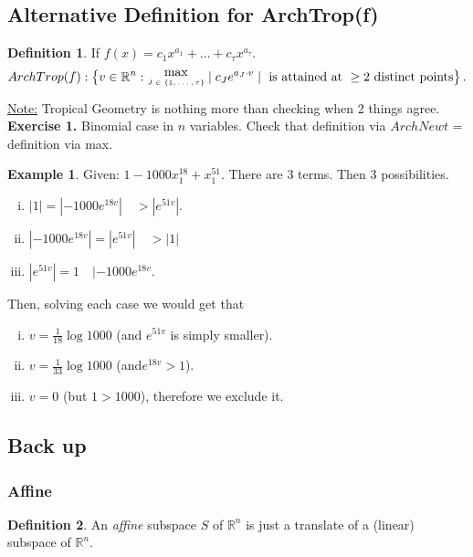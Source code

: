 \documentclass[]{article}
\theoremstyle{definition}
\newtheorem*{defn}{Definition}
\newtheorem{ex}{Example}[section]
\begin{document}
			\subsection{Alternative Definition for ArchTrop(f)}
			\begin{defn}
			If $f(x)=c_1x^{a_1} +\ldots+c_\tau x^{a_\tau}$.
			\begin{align*}
			ArchTrop(f): \left\{ v \in \mathbb{R}^n : \stackanchor{max}{\tiny{$J\in\{1,\ldots,\tau\}$}} \mid c_{J}e^{a_J\cdot v} \mid \text{ is attained at }\geq 2 \text{ distinct points}\right\}.
			\end{align*}
			\end{defn}
			\underline{Note:} Tropical Geometry is nothing more than checking when 2 things agree.
			\\
			\textbf{Exercise 1.} Binomial case in $n$ variables. Check that definition via $ArchNewt$ = definition via max.
			\begin{ex}
			Given: $1-1000x_1^{18}+x_1^{51}.$ There are 3 terms. Then 3 possibilities.
			\begin{enumerate}[(i)]
			\item $|1|=|-1000e^{18v}| \quad > |e^{51v}|$.
			\item $|-1000e^{18v}| = | e^{51v}| \quad > |1|$
			\item $|e^{51v}| = 1 \quad |-1000e^{18v}$.
			\end{enumerate}
			Then, solving each case we would get that 
			\begin{enumerate}[(i)]
			\item $v= \frac{1}{18} \log 1000$ (and $e^{51v}$ is simply smaller).
			\item $v = \frac{1}{33} \log 1000$ (and$ e^{18v}>1$).
			\item $v=0$ (but $1>1000$), therefore we exclude it.
			\end{enumerate}
			\end{ex}
			\subsection{Back up}
			\subsubsection{Affine}
			\begin{defn}
			An \emph{affine} subspace $S$ of $\mathbb{R}^n$ is just a translate of a (linear) subspace of $\mathbb{R}^n$.
			\end{defn}
\end{document}

